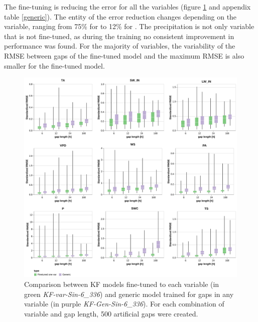 \documentclass{article}
\newcommand{\imgwidth}{6in}
\begin{document}
The fine-tuning is reducing the error for all the variables (figure \ref{fig:generic} and appendix table \ref{generic}). The entity of the error reduction changes depending on the variable, ranging from 75\% for  to 12\% for .
The precipitation is not only variable that is not fine-tuned, as during the training no consistent improvement in performance was found.
For the majority of variables, the variability of the RMSE between gaps of the fine-tuned model and the maximum RMSE is also smaller for the fine-tuned model.


\begin{figure}
\centerline{\includegraphics[width=\imgwidth]{images2/generic.png}}
\caption{Comparison between KF models fine-tuned to each variable (in green \textit{KF-\textlangle var\textrangle-Sin-6\_336}) and generic model trained for gaps in any variable (in purple \textit{KF-Gen-Sin-6\_336}). For each combination of variable and gap length, 500 artificial gaps were created.}
\label{fig:generic}
\end{figure}
\end{document}
